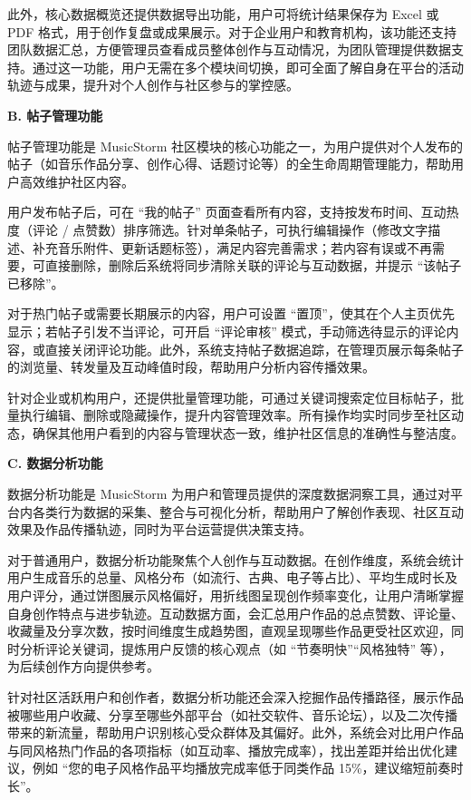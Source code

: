 \documentclass{base}
\numberwithin{figure}{section} %
\begin{document}
此外，核心数据概览还提供数据导出功能，用户可将统计结果保存为 Excel 或 PDF 格式，用于创作复盘或成果展示。对于企业用户和教育机构，该功能还支持团队数据汇总，方便管理员查看成员整体创作与互动情况，为团队管理提供数据支持。通过这一功能，用户无需在多个模块间切换，即可全面了解自身在平台的活动轨迹与成果，提升对个人创作与社区参与的掌控感。

\textbf{B. 帖子管理功能}

帖子管理功能是 MusicStorm 社区模块的核心功能之一，为用户提供对个人发布的帖子（如音乐作品分享、创作心得、话题讨论等）的全生命周期管理能力，帮助用户高效维护社区内容。

用户发布帖子后，可在 “我的帖子” 页面查看所有内容，支持按发布时间、互动热度（评论 / 点赞数）排序筛选。针对单条帖子，可执行编辑操作（修改文字描述、补充音乐附件、更新话题标签），满足内容完善需求；若内容有误或不再需要，可直接删除，删除后系统将同步清除关联的评论与互动数据，并提示 “该帖子已移除”。

对于热门帖子或需要长期展示的内容，用户可设置 “置顶”，使其在个人主页优先显示；若帖子引发不当评论，可开启 “评论审核” 模式，手动筛选待显示的评论内容，或直接关闭评论功能。此外，系统支持帖子数据追踪，在管理页展示每条帖子的浏览量、转发量及互动峰值时段，帮助用户分析内容传播效果。

针对企业或机构用户，还提供批量管理功能，可通过关键词搜索定位目标帖子，批量执行编辑、删除或隐藏操作，提升内容管理效率。所有操作均实时同步至社区动态，确保其他用户看到的内容与管理状态一致，维护社区信息的准确性与整洁度。

\textbf{C. 数据分析功能}

数据分析功能是 MusicStorm 为用户和管理员提供的深度数据洞察工具，通过对平台内各类行为数据的采集、整合与可视化分析，帮助用户了解创作表现、社区互动效果及作品传播轨迹，同时为平台运营提供决策支持。​

对于普通用户，数据分析功能聚焦个人创作与互动数据。在创作维度，系统会统计用户生成音乐的总量、风格分布（如流行、古典、电子等占比）、平均生成时长及用户评分，通过饼图展示风格偏好，用折线图呈现创作频率变化，让用户清晰掌握自身创作特点与进步轨迹。互动数据方面，会汇总用户作品的总点赞数、评论量、收藏量及分享次数，按时间维度生成趋势图，直观呈现哪些作品更受社区欢迎，同时分析评论关键词，提炼用户反馈的核心观点（如 “节奏明快”“风格独特” 等），为后续创作方向提供参考。

针对社区活跃用户和创作者，数据分析功能还会深入挖掘作品传播路径，展示作品被哪些用户收藏、分享至哪些外部平台（如社交软件、音乐论坛），以及二次传播带来的新流量，帮助用户识别核心受众群体及其偏好。此外，系统会对比用户作品与同风格热门作品的各项指标（如互动率、播放完成率），找出差距并给出优化建议，例如 “您的电子风格作品平均播放完成率低于同类作品 15\%，建议缩短前奏时长”。​
\end{document}
